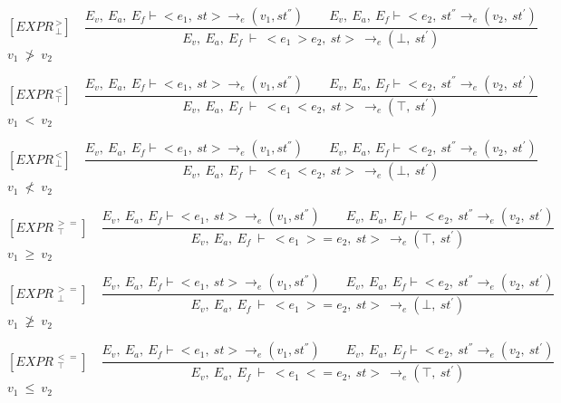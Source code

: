    	\[
   	[EXPR^{\ >}_{\ \bot}] \quad
   	\dfrac{E_v, \ E_a, \ E_f \vdash <e_1, \ st> \rightarrow_e (v_1, st^{''}) \qquad E_v, \ E_a, \ E_f \vdash <e_2, \ st^{''} \rightarrow_e (v_2, \ st^{'})}{E_v, \ E_a, \ E_f \ \vdash \ <e_1 \ > e_2, \ st> \ \rightarrow_e (\bot, \ st^{'})}
   	\]
	\begin{math}
   	v_1 \ \not> \ v_2
   	\end{math}   
   	
   	\[
   	[EXPR^{\ <}_{\ \top}] \quad
   	\dfrac{E_v, \ E_a, \ E_f \vdash <e_1, \ st> \rightarrow_e (v_1, st^{''}) \qquad E_v, \ E_a, \ E_f \vdash <e_2, \ st^{''} \rightarrow_e (v_2, \ st^{'})}{E_v, \ E_a, \ E_f \ \vdash \ <e_1 \ < e_2, \ st> \ \rightarrow_e (\top, \ st^{'})}
   	\]
	\begin{math}
   	v_1 \ < \ v_2
   	\end{math}   	
   	

   	\[
   	[EXPR^{\ <}_{\ \bot}] \quad
   	\dfrac{E_v, \ E_a, \ E_f \vdash <e_1, \ st> \rightarrow_e (v_1, st^{''}) \qquad E_v, \ E_a, \ E_f \vdash <e_2, \ st^{''} \rightarrow_e (v_2, \ st^{'})}{E_v, \ E_a, \ E_f \ \vdash \ <e_1 \ < e_2, \ st> \ \rightarrow_e (\bot, \ st^{'})}
   	\]
	\begin{math}
   	v_1 \ \not< \ v_2
   	\end{math}
   	
   	\[
   	[EXPR^{\ >=}_{\ \ \top}] \quad
   	\dfrac{E_v, \ E_a, \ E_f \vdash <e_1, \ st> \rightarrow_e (v_1, st^{''}) \qquad E_v, \ E_a, \ E_f \vdash <e_2, \ st^{''} \rightarrow_e (v_2, \ st^{'})}{E_v, \ E_a, \ E_f \ \vdash \ <e_1 \ >= e_2, \ st> \ \rightarrow_e (\top, \ st^{'})}
   	\]
	\begin{math}
   	v_1 \ \ge \ v_2
   	\end{math}   	
   	

   	\[
   	[EXPR^{\ >=}_{\ \ \bot}] \quad
   	\dfrac{E_v, \ E_a, \ E_f \vdash <e_1, \ st> \rightarrow_e (v_1, st^{''}) \qquad E_v, \ E_a, \ E_f \vdash <e_2, \ st^{''} \rightarrow_e (v_2, \ st^{'})}{E_v, \ E_a, \ E_f \ \vdash \ <e_1 \ >= e_2, \ st> \ \rightarrow_e (\bot, \ st^{'})}
   	\]
	\begin{math}
   	v_1 \ \ngeq \ v_2
   	\end{math}
   	
   	\[
   	[EXPR^{\ <=}_{\ \ \top}] \quad
   	\dfrac{E_v, \ E_a, \ E_f \vdash <e_1, \ st> \rightarrow_e (v_1, st^{''}) \qquad E_v, \ E_a, \ E_f \vdash <e_2, \ st^{''} \rightarrow_e (v_2, \ st^{'})}{E_v, \ E_a, \ E_f \ \vdash \ <e_1 \ <= e_2, \ st> \ \rightarrow_e (\top, \ st^{'})}
   	\]
	\begin{math}
   	v_1 \ \le \ v_2
   	\end{math}   	
   	


